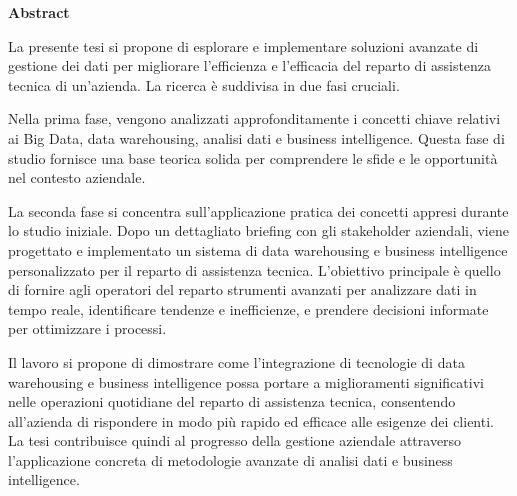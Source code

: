 \label{Abstract}

\begin{center}

\Large
\textbf{Abstract}
    
\end{center}


La presente tesi si propone di esplorare e implementare soluzioni avanzate di gestione dei dati per migliorare l'efficienza e l'efficacia del reparto di assistenza tecnica di un'azienda. La ricerca è suddivisa in due fasi cruciali.

Nella prima fase, vengono analizzati approfonditamente i concetti chiave relativi ai Big Data, data warehousing, analisi dati e business intelligence. Questa fase di studio fornisce una base teorica solida per comprendere le sfide e le opportunità nel contesto aziendale.

La seconda fase si concentra sull'applicazione pratica dei concetti appresi durante lo studio iniziale. Dopo un dettagliato briefing con gli stakeholder aziendali, viene progettato e implementato un sistema di data warehousing e business intelligence personalizzato per il reparto di assistenza tecnica. L'obiettivo principale è quello di fornire agli operatori del reparto strumenti avanzati per analizzare dati in tempo reale, identificare tendenze e inefficienze, e prendere decisioni informate per ottimizzare i processi.

Il lavoro si propone di dimostrare come l'integrazione di tecnologie di data warehousing e business intelligence possa portare a miglioramenti significativi nelle operazioni quotidiane del reparto di assistenza tecnica, consentendo all'azienda di rispondere in modo più rapido ed efficace alle esigenze dei clienti. La tesi contribuisce quindi al progresso della gestione aziendale attraverso l'applicazione concreta di metodologie avanzate di analisi dati e business intelligence.